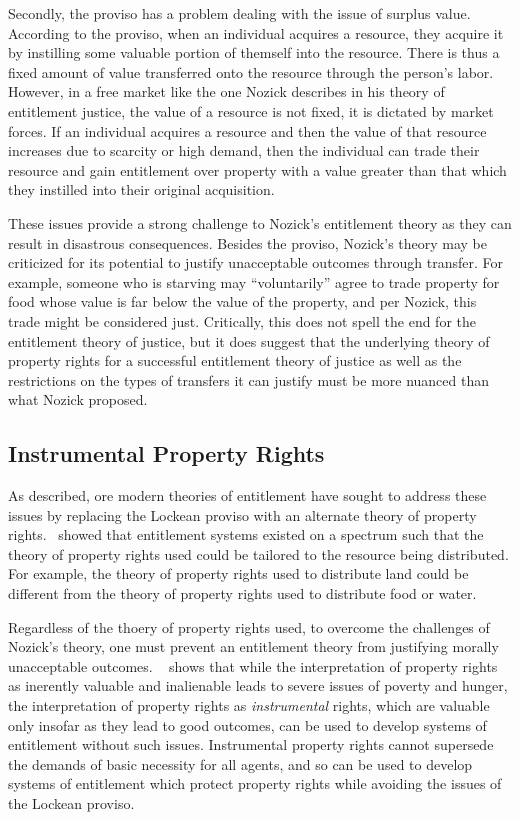 Secondly, the proviso has a problem dealing with the issue of surplus value. 
According to the proviso, when an individual acquires a resource, they acquire
it by instilling some valuable portion of themself into the resource. There is
thus a fixed amount of value transferred onto the resource through the person's
labor. However, in a free market like the one Nozick describes in his 
theory of entitlement justice, the value of a resource is not fixed, it is
dictated by market forces. If an individual acquires a resource and then the 
value of that resource increases due to scarcity or high demand, then the
individual can trade their resource and gain entitlement over property with a 
value greater than that which they instilled into their original acquisition.

These issues provide a strong challenge to Nozick's entitlement theory as they
can result in disastrous consequences. Besides the proviso, Nozick's theory may
be criticized for its potential to justify unacceptable outcomes through
transfer. For example, someone who is starving may ``voluntarily'' agree to
trade property for food whose value is far below the value of the property, and
per Nozick, this trade might be considered just.  Critically, this does not
spell the end for the entitlement theory of justice, but it does suggest that
the underlying theory of property rights for a successful entitlement theory of
justice as well as the restrictions on the types of transfers it can justify
must be more nuanced than what Nozick proposed.

\subsection{Instrumental Property Rights}

As described, ore modern theories of entitlement have sought to address these
issues by replacing the Lockean proviso with an alternate theory of property
rights.~\cite{Van_der_Veen_1985} showed that entitlement systems existed on a 
spectrum such that the theory of property rights used could be tailored to the
resource being distributed. For example, the theory of property rights used to
distribute land could be different from the theory of property rights used to
distribute food or water.

Regardless of the thoery of property rights used, to overcome the challenges of
Nozick's theory, one must prevent an entitlement theory from justifying morally
unacceptable outcomes. ~\cite{Sen_1988} shows that while the interpretation of
property rights as inerently valuable and inalienable leads to severe issues of
poverty and hunger, the interpretation of property rights as
\textit{instrumental} rights, which are valuable only insofar as they lead to
good outcomes, can be used to develop systems of entitlement without such
issues. Instrumental property rights cannot supersede the demands of basic
necessity for all agents, and so can be used to develop systems of entitlement
which protect property rights while avoiding the issues of the Lockean proviso.

